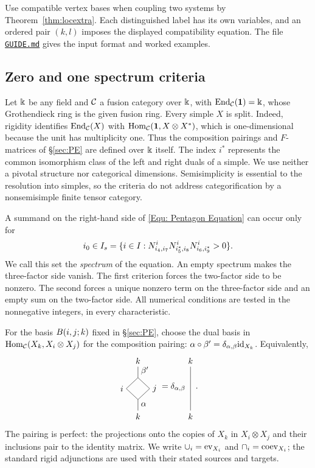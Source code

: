 \documentclass{amsart}
\begin{document}
Use compatible vertex bases when coupling two systems by Theorem~\ref{thm:locextra}. Each distinguished label has its own variables, and an ordered pair $(k,l)$ imposes the displayed compatibility equation. The file \href{https://github.com/sebastienpalcoux/triangular-prism-categorification/blob/f816c697fde088b261e1fe1ce703980e5dbdab51/GUIDE.md}{\texttt{GUIDE.md}} gives the input format and worked examples.

\subsection{Zero and one spectrum criteria} \label{sec:SpeCrit}
Let $\Bbbk$ be any field and $\mathcal{C}$ a fusion category over $\Bbbk$, with $\mathrm{End}_{\mathcal{C}}({\bf 1})=\Bbbk$, whose Grothendieck ring is the given fusion ring. Every simple $X$ is split. Indeed, rigidity identifies $\mathrm{End}_{\mathcal{C}}(X)$ with $\mathrm{Hom}_{\mathcal{C}}({\bf 1},X\otimes X^*)$, which is one-dimensional because the unit has multiplicity one. Thus the composition pairings and $F$-matrices of \S\ref{sec:PE} are defined over $\Bbbk$ itself. The index $i^*$ represents the common isomorphism class of the left and right duals of a simple. We use neither a pivotal structure nor categorical dimensions. Semisimplicity is essential to the resolution into simples, so the criteria do not address categorification by a nonsemisimple finite tensor category.

A summand on the right-hand side of \eqref{Equ: Pentagon Equation} can occur only for
\[
 i_0\in I_{s}=\{i\in I:N_{i_4,i_7}^{i}N_{i_5^*,i_8}^{i}N_{i_6,i_9^*}^{i}>0\}.
\]
We call this set the \emph{spectrum} of the equation. An empty spectrum makes the three-factor side vanish. The first criterion forces the two-factor side to be nonzero. The second forces a unique nonzero term on the three-factor side and an empty sum on the two-factor side. All numerical conditions are tested in the nonnegative integers, in every characteristic.

\begin{notation} \label{not:2}
For the basis $B(i,j;k)$ fixed in \S\ref{sec:PE}, choose the dual basis in $\mathrm{Hom}_{\mathcal{C}}(X_k,X_i\otimes X_j)$ for the composition pairing: $\alpha\circ\beta'=\delta_{\alpha,\beta}\mathrm{id}_{X_k}$. Equivalently,
\[
\begin{tikzpicture}[baseline=(current bounding box.center),scale=.65]
\draw (0,1.7) node[above] {$k$} --(0,1)
 --(-.75,.3)--(0,-.4)--(0,-1.1) node[below] {$k$};
\draw (0,1)--(.75,.3)--(0,-.4);
\node[left] at (-.75,.3) {$i$};\node[right] at (.75,.3) {$j$};
\node[above right] at (0,1) {$\beta'$};\node[below right] at (0,-.4) {$\alpha$};
\end{tikzpicture}
=\delta_{\alpha,\beta}
\begin{tikzpicture}[baseline=(current bounding box.center),scale=.65]
\draw (0,1.7) node[above] {$k$} -- (0,-1.1) node[below] {$k$};
\end{tikzpicture}.
\]
The pairing is perfect: the projections onto the copies of $X_k$ in $X_i\otimes X_j$ and their inclusions pair to the identity matrix. We write
$\cup_i=\mathrm{ev}_{X_i}$ and $\cap_i=\mathrm{coev}_{X_i}$; the standard rigid
adjunctions are used with their stated sources and targets.
\end{notation}
\end{document}
